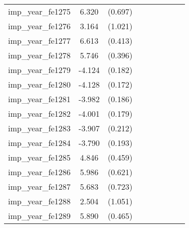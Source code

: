 {\begin{tabular}{l*{4}{cc}}
imp\_year\_fe1275&    6.320\sym{***}&  (0.697)&                  &         &                  &         &                  &         \\
imp\_year\_fe1276&    3.164\sym{**} &  (1.021)&                  &         &                  &         &                  &         \\
imp\_year\_fe1277&    6.613\sym{***}&  (0.413)&                  &         &                  &         &                  &         \\
imp\_year\_fe1278&    5.746\sym{***}&  (0.396)&                  &         &                  &         &                  &         \\
imp\_year\_fe1279&   -4.124\sym{***}&  (0.182)&                  &         &                  &         &                  &         \\
imp\_year\_fe1280&   -4.128\sym{***}&  (0.172)&                  &         &                  &         &                  &         \\
imp\_year\_fe1281&   -3.982\sym{***}&  (0.186)&                  &         &                  &         &                  &         \\
imp\_year\_fe1282&   -4.001\sym{***}&  (0.179)&                  &         &                  &         &                  &         \\
imp\_year\_fe1283&   -3.907\sym{***}&  (0.212)&                  &         &                  &         &                  &         \\
imp\_year\_fe1284&   -3.790\sym{***}&  (0.193)&                  &         &                  &         &                  &         \\
imp\_year\_fe1285&    4.846\sym{***}&  (0.459)&                  &         &                  &         &                  &         \\
imp\_year\_fe1286&    5.986\sym{***}&  (0.621)&                  &         &                  &         &                  &         \\
imp\_year\_fe1287&    5.683\sym{***}&  (0.723)&                  &         &                  &         &                  &         \\
imp\_year\_fe1288&    2.504\sym{*}  &  (1.051)&                  &         &                  &         &                  &         \\
imp\_year\_fe1289&    5.890\sym{***}&  (0.465)&                  &         &                  &         &                  &         \\

\end{tabular}}
